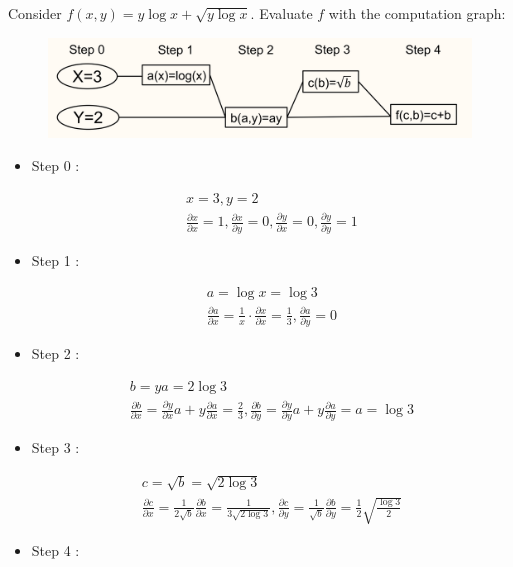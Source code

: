 \begin{example}
    Consider $f(x, y)=y \log x+\sqrt{y \log x}$. Evaluate $f$ with the computation graph:

    \begin{figure}[H]
        \centering
        \includegraphics[width=1.0\textwidth]{.././assets/6.11.png}
    \end{figure}

    \begin{itemize}
        \item
        Step 0 :

        $$
        \begin{gathered}
        x=3, y=2 \\
        \frac{\partial x}{\partial x}=1, \frac{\partial x}{\partial y}=0, \frac{\partial y}{\partial x}=0, \frac{\partial y}{\partial y}=1
        \end{gathered}
        $$
        \item
        Step 1 :

        $$
        \begin{gathered}
        a=\log x=\log 3 \\
        \frac{\partial a}{\partial x}=\frac{1}{x} \cdot \frac{\partial x}{\partial x}=\frac{1}{3}, \frac{\partial a}{\partial y}=0
        \end{gathered}
        $$
        \item
        Step 2 :

        $$
        \begin{gathered}
        b=y a=2 \log 3 \\
        \frac{\partial b}{\partial x}=\frac{\partial y}{\partial x} a+y \frac{\partial a}{\partial x}=\frac{2}{3}, \frac{\partial b}{\partial y}=\frac{\partial y}{\partial y} a+y \frac{\partial a}{\partial y}=a=\log 3
        \end{gathered}
        $$
        \item
        Step 3 :

        $$
        \begin{gathered}
        c=\sqrt{b}=\sqrt{2 \log 3} \\
        \frac{\partial c}{\partial x}=\frac{1}{2 \sqrt{b}} \frac{\partial b}{\partial x}=\frac{1}{3 \sqrt{2 \log 3}}, \frac{\partial c}{\partial y}=\frac{1}{\sqrt{b}} \frac{\partial b}{\partial y}=\frac{1}{2} \sqrt{\frac{\log 3}{2}}
        \end{gathered}
        $$
        \item
        Step 4 :


\end{itemize}
\end{example}
